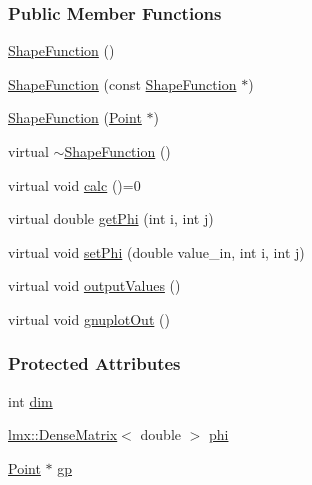 \subsubsection*{Public Member Functions}
\begin{DoxyCompactItemize}
\item 
\hyperlink{classmknix_1_1_shape_function_a4a35da60e8eb2645a217cce36e6e323a}{Shape\+Function} ()
\item 
\hyperlink{classmknix_1_1_shape_function_ae8a319daf0505fbacb0f159226e1a5ab}{Shape\+Function} (const \hyperlink{classmknix_1_1_shape_function}{Shape\+Function} $\ast$)
\item 
\hyperlink{classmknix_1_1_shape_function_adaf264f0f7ae964f9c9dc513e3fe7195}{Shape\+Function} (\hyperlink{classmknix_1_1_point}{Point} $\ast$)
\item 
virtual \hyperlink{classmknix_1_1_shape_function_ac5762f37f460aa48b8d2a53a1f422220}{$\sim$\+Shape\+Function} ()
\item 
virtual void \hyperlink{classmknix_1_1_shape_function_ac4a0d1b43ff7d4adf788e677912a87f7}{calc} ()=0
\item 
virtual double \hyperlink{classmknix_1_1_shape_function_a13f35e2b1cfc89c26ee03ede4bfff586}{get\+Phi} (int i, int j)
\item 
virtual void \hyperlink{classmknix_1_1_shape_function_a45248275e5e6fcaed37195155009e72e}{set\+Phi} (double value\+\_\+in, int i, int j)
\item 
virtual void \hyperlink{classmknix_1_1_shape_function_a50beef3ce4e90c4f884df14f727296f6}{output\+Values} ()
\item 
virtual void \hyperlink{classmknix_1_1_shape_function_a6b287c3758e7d16be4c7c8e86bbb7077}{gnuplot\+Out} ()
\end{DoxyCompactItemize}
\subsubsection*{Protected Attributes}
\begin{DoxyCompactItemize}
\item 
int \hyperlink{classmknix_1_1_shape_function_a1ca9a4d7bc5f82c887ac7e9bdd54aa1e}{dim}
\item 
\hyperlink{classlmx_1_1_dense_matrix}{lmx\+::\+Dense\+Matrix}$<$ double $>$ \hyperlink{classmknix_1_1_shape_function_ac1eaf8c2e5d8d6abf4726eb416de13d9}{phi}
\item 
\hyperlink{classmknix_1_1_point}{Point} $\ast$ \hyperlink{classmknix_1_1_shape_function_a70f36189e78b80d045076234e4c668da}{gp}
\end{DoxyCompactItemize}



